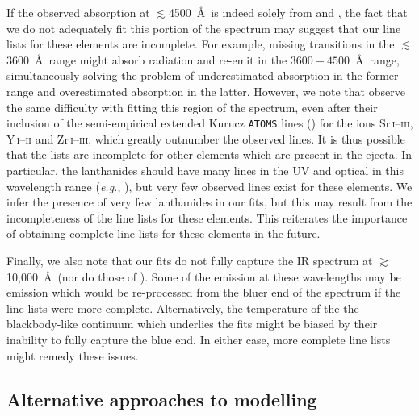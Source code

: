 \documentclass[twocolumn, twocolappendix]{aastex63}
\def\eg{{\it e.g.}}
\begin{document}
If the observed absorption at $\lesssim$4500~\AA~is indeed solely from  and , the fact that we do not adequately fit this portion of the spectrum may suggest that our line lists for these elements are incomplete. For example, missing transitions in the $\lesssim$3600~\AA~range might absorb radiation and re-emit in the $3600 - 4500$~\AA~range, simultaneously solving the problem of underestimated absorption in the former range and overestimated absorption in the latter. However, we note that \cite{gillanders22} observe the same difficulty with fitting this region of the spectrum, even after their inclusion of the semi-empirical extended Kurucz \texttt{ATOMS} lines (\citealt{kurucz18}) for the ions \mbox{Sr\,\textsc{i}--\textsc{iii}}, \mbox{Y\,\textsc{i}--\textsc{ii}} and \mbox{Zr\,\textsc{i}--\textsc{iii}}, which greatly outnumber the observed lines. It is thus possible that the lists are incomplete for other elements which are present in the ejecta. In particular, the lanthanides should have many lines in the UV and optical in this wavelength range (\eg, \citealt{tanaka20}), but very few observed lines exist for these elements. We infer the presence of very few lanthanides in our fits, but this may result from the incompleteness of the line lists for these elements. This reiterates the importance of obtaining complete line lists for these elements in the future. 

Finally, we also note that our fits do not fully capture the IR spectrum at $\gtrsim$10,000~\AA~(nor do those of \citealt{gillanders22}). Some of the emission at these wavelengths may be emission which would be re-processed from the bluer end of the spectrum if the line lists were more complete. Alternatively, the temperature of the the blackbody-like continuum which underlies the fits might be biased by their inability to fully capture the blue end. In either case, more complete line lists might remedy these issues. 


\subsection{Alternative approaches to modelling}\label{ssc:alternative_approaches}
\end{document}
